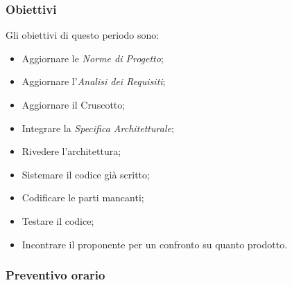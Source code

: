 \subsubsection{Obiettivi}
Gli obiettivi di questo periodo sono:
\begin{itemize}
    \item Aggiornare le \textit{Norme di Progetto};
    \item Aggiornare l'\textit{Analisi dei Requisiti};
    \item Aggiornare il Cruscotto;
    \item Integrare la \textit{Specifica Architetturale};
    \item Rivedere l'architettura;
    \item Sistemare il codice già scritto;
    \item Codificare le parti mancanti;
    \item Testare il codice;
    \item Incontrare il proponente per un confronto su quanto prodotto.

\end{itemize}

\subsubsection{Preventivo orario}

